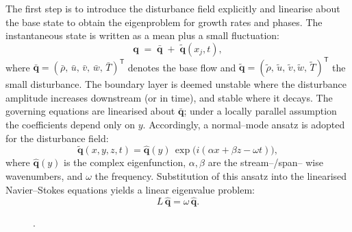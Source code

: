 The first step is to introduce the disturbance field explicitly and linearise about the base state to obtain the eigenproblem for growth rates and phases. The instantaneous state is written as a mean plus a small fluctuation:
\begin{equation}
  \boldsymbol{q} \;=\; \bar{\boldsymbol{q}}\;+\; \tilde{\boldsymbol{q}}(x_j,t),
\end{equation}
where $\bar{\boldsymbol{q}}=(\bar{\rho},\,\bar{u},\,\bar{v},\,\bar{w},\,\bar{T})^{\mathsf{T}}$ denotes the base flow and $\tilde{\boldsymbol{q}}=(\tilde{\rho},\,\tilde{u},\,\tilde{v},\tilde{w},\,\tilde{T})^{\mathsf{T}}$ the small disturbance. The boundary layer is deemed unstable where the disturbance amplitude increases downstream (or in time), and stable where it decays. The governing equations are linearised about $\bar{\boldsymbol{q}}$; under a locally parallel assumption the coefficients depend only on $y$. Accordingly, a normal--mode ansatz is adopted for the disturbance field:
\begin{equation}
  \tilde{\boldsymbol{q}}(x,y,z,t)
  = \hat{\boldsymbol{q}}(y)\,\exp\!\big(i(\alpha x+\beta z-\omega t)\big),
\end{equation}
where $\hat{\boldsymbol{q}}(y)$ is the complex eigenfunction, $\alpha,\beta$ are the stream--/span-- wise wavenumbers, and $\omega$ the frequency. Substitution of this ansatz into the linearised Navier--Stokes equations yields a linear eigenvalue problem:
\begin{equation*}
  L\,\hat{\boldsymbol{q}} = \omega\,\hat{\boldsymbol{q}}.
\end{equation*}


\begin{figure}[hbt!]
    \centering
    \fontsize{9}{10}\selectfont
    .
    \label{figure:schematicmackmode}
\end{figure}


